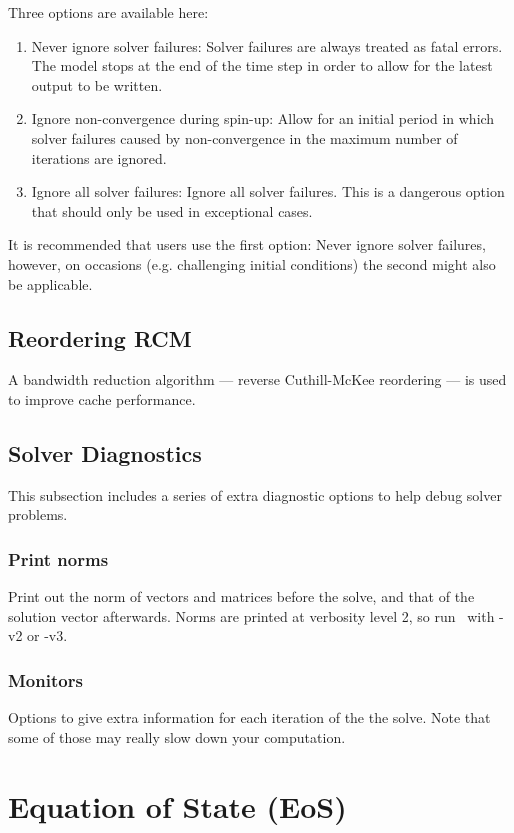 Three options are available here:

\begin{enumerate}
\item Never ignore solver failures: Solver failures are always treated as fatal errors. The model stops at the end of the time step in order to allow for the latest output to be written. 
\item Ignore non-convergence during spin-up: Allow for an initial period in which solver failures caused by non-convergence in the maximum number of iterations are ignored. 
\item Ignore all solver failures: Ignore all solver failures. This is a dangerous option that should only be used in exceptional cases. 
\end{enumerate}

It is recommended that users use the first option: Never ignore solver failures, however, on occasions (e.g. challenging initial conditions) the second might also be applicable. 

\subsection{Reordering RCM}

A bandwidth reduction algorithm --- reverse Cuthill-McKee reordering --- is used to improve cache performance.

\subsection{Solver Diagnostics}

This subsection includes a series of extra diagnostic options to help debug solver problems. 

\subsubsection{Print norms}
Print out the norm of vectors and matrices before the solve, and that of the solution vector afterwards. Norms are printed at verbosity level 2, so run \fluidity\ with -v2 or -v3.

\subsubsection{Monitors}
Options to give extra information for each iteration of the the solve. Note that some of those may really slow down your computation. 


\section{Equation of State (EoS)}\label{sec:ConfigEOS}

